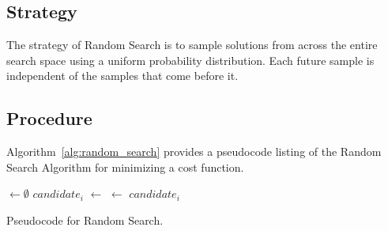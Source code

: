 \subsection{Strategy}
The strategy of Random Search is to sample solutions from across the entire search space using a uniform probability distribution. Each future sample is independent of the samples that come before it.

\subsection{Procedure}
Algorithm~\ref{alg:random_search} provides a pseudocode listing of the Random Search Algorithm for minimizing a cost function.

\begin{algorithm}[htp]
	\SetLine
	\KwIn{\NumIterations, \ProblemSize, \SearchSpace}
	\KwOut{\Best}
	\Best $\leftarrow \emptyset$\;
	 {
		$candidate_i$ $\leftarrow$ \RandomSolution{\ProblemSize, \SearchSpace}\;
		 {
			\Best $\leftarrow$ $candidate_i$\;
		}
	}
	\Return{\Best}\;
	\caption{Pseudocode for Random Search.}
	\label{alg:random_search}
\end{algorithm}

